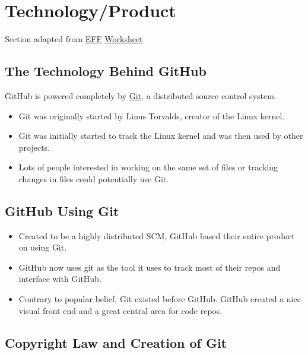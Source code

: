 \section{Technology/Product}\label{technologyproduct}

Section adapted from \url{EFF}
\href{http://www.teachingcopyright.org/handout/technology-history-worksheet}{Worksheet}

\subsection{The Technology Behind
GitHub}\label{the-technology-behind-github}

GitHub is powered completely by
\href{http://en.wikipedia.org/wiki/Git_\%28software\%29}{Git}, a
distributed source control system.

\begin{itemize}
\itemsep1pt\parskip0pt
\item
  Git was originally started by Linus Torvalds, creator of the Linux
  kernel.
\item
  Git was initially started to track the Linux kernel and was then used
  by other projects.
\item
  Lots of people interested in working on the same set of files or
  tracking changes in files could potentially use
  Git.\href{http://en.wikipedia.org/wiki/Git_\%28software\%29}{}
\end{itemize}

\subsection{GitHub Using Git}\label{github-using-git}

\begin{itemize}
\itemsep1pt\parskip0pt
\item
  Created to be a highly distributed SCM, GitHub based their entire
  product on using Git.
\item
  GitHub now uses git as the tool it uses to track most of their repos
  and interface with GitHub.
\item
  Contrary to popular belief, Git existed before GitHub. GitHub created
  a nice visual front end and a great central area for code repos.
\end{itemize}

\subsection{Copyright Law and Creation of
Git}\label{copyright-law-and-creation-of-git}

